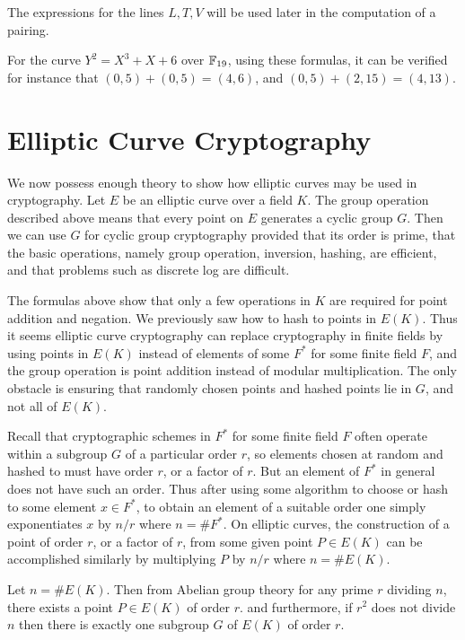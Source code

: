 The expressions for the lines $L,T,V$ will be used later in the computation
of a pairing.

For the curve $Y^2 = X^3 + X + 6$ over $\mathbb{F}_{19}$,
using these formulas, it can be verified for instance that
$(0, 5) + (0, 5) = (4, 6)$,
and $(0, 5) + (2, 15) = (4, 13)$.

\section {Elliptic Curve Cryptography}

We now possess enough theory to show how elliptic curves may be used
in cryptography.
Let $E$ be an elliptic curve over a field $K$.
The group operation described above means that every point on $E$
generates a cyclic group $G$.
Then we can use $G$ for cyclic group cryptography
provided that its order is prime,
that the basic operations, namely group operation, inversion, hashing,
are efficient, and that problems such as discrete log are difficult.

The formulas above show that only a few operations in $K$ are required for
point addition and negation.
We previously saw how to hash to points in $E(K)$.
Thus it seems elliptic curve cryptography can replace
cryptography in finite fields by using
points in $E(K)$ instead of elements of some $F^*$ for some finite field $F$,
and the group operation is point addition instead of modular multiplication.
The only obstacle is ensuring that randomly chosen points and hashed points
lie in $G$, and not all of $E(K)$.

Recall that cryptographic schemes in $F^*$ for some finite field $F$
often operate within a subgroup $G$ of a particular order $r$,
so elements chosen at random and hashed to must have
order $r$, or a factor of $r$. But an element of $F^*$
in general does not have such an order.
Thus after using some algorithm to
choose or hash to some element $x \in F^*$,
to obtain an element of a suitable order one simply exponentiates $x$
by $n / r$ where $n = \#F^*$.
On elliptic curves, the construction of a point of order $r$,
or a factor of $r$, from some given point $P \in E(K)$ can be accomplished
similarly by multiplying $P$ by
$n / r$ where $n = \#E(K)$.

Let $n = \#E(K)$. Then from Abelian group theory
for any prime $r$ dividing $n$,
there exists a point $P \in E(K)$ of order $r$.
and furthermore, if $r^2$ does not divide $n$ then there is exactly one
subgroup $G$ of $E(K)$ of order $r$.

